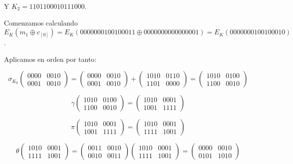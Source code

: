 \documentclass[a4paper]{article}
\begin{document}
Y $K_2=1101 1000 1011 1000$.

Comenzamos calculando $E_K (m_1 \oplus c_{[0]} ) = E_K ( 0000 0001 0010 0011 \oplus 0000 0000 0000 0001) = E_K(0000 0001 0010 0010)$.

Aplicamos en orden por tanto:

$$\sigma_{K_0} \begin{pmatrix} 0000 & 0010 \\ 0001 & 0010 \end{pmatrix} = \begin{pmatrix} 0000 & 0010 \\ 0001 & 0010 \end{pmatrix} + \begin{pmatrix} 1010 & 0110 \\ 1101 & 0000 \end{pmatrix} = \begin{pmatrix} 1010 & 0100 \\ 1100 & 0010 \end{pmatrix}$$

$$\gamma \begin{pmatrix} 1010 & 0100 \\ 1100 & 0010 \end{pmatrix} = \begin{pmatrix} 1010 & 0001 \\ 1001 & 1111 \end{pmatrix}$$

$$\pi \begin{pmatrix} 1010 & 0001 \\ 1001 & 1111 \end{pmatrix} = \begin{pmatrix} 1010 & 0001 \\ 1111 & 1001 \end{pmatrix}$$

$$\theta \begin{pmatrix} 1010 & 0001 \\ 1111 & 1001 \end{pmatrix} = \begin{pmatrix} 0011 & 0010 \\ 0010 & 0011 \end{pmatrix}\begin{pmatrix} 1010 & 0001 \\ 1111 & 1001 \end{pmatrix} = \begin{pmatrix} 0000 & 0010 \\ 0101 & 1010 \end{pmatrix}$$
\end{document}
